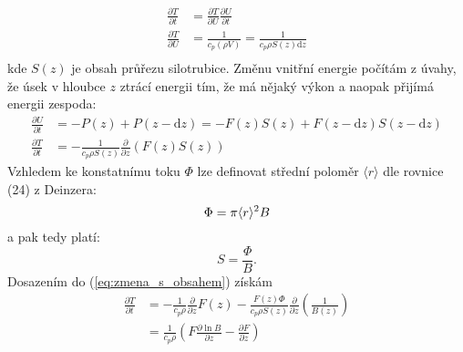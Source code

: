\documentclass[11pt]{article}
\def\D{\mathrm{d}}
\newcommand{\pder}[2][]{\frac{\partial#1}{\partial#2}}
\begin{document}
\begin{align}
	\pder[T]{t} &= \pder[T]{U}\pder[U]{t}\\
	\pder[T]{U} &= \frac{1}{c_p(\rho V)} = \frac{1}{c_p\rho S(z)\D z}\\
\end{align}
kde $S(z)$ je obsah průřezu silotrubice. Změnu vnitřní energie počítám z úvahy, že úsek v hloubce $z$ ztrácí energii tím, že má nějaký výkon a naopak přijímá energii zespoda:
\begin{align}
	\pder[U]{t} &= -P(z)+P(z-\D z) = -F(z)S(z)+F(z-\D z)S(z-\D z)\\
	\pder[T]{t} &= -\frac{1}{c_p\rho S(z)}\pder[]{z}(F(z)S(z)) \label{eq:zmena_s_obsahem}
\end{align}
Vzhledem ke konstatnímu toku $\Phi$ lze definovat střední poloměr $\langle r\rangle$ dle rovnice (24) z Deinzera:
\begin{equation}
	\Phi=\pi\langle r \rangle^2 B \\
\end{equation}
a pak tedy platí:
\begin{equation}
	S = \frac{\Phi}{B}.
\end{equation}
Dosazením do (\ref{eq:zmena_s_obsahem}) získám
\begin{equation}
\begin{aligned}
	\pder[T]{t} &= -\frac{1}{c_p\rho}\pder[]{z}F(z)-\frac{F(z)\Phi}{c_p\rho S(z)}\pder[]{z}\left(\frac{1}{B(z)}\right)\\
				&= \frac{1}{c_p\rho}\left(F\pder[\ln B]{z}-\pder[F]{z}\right)
\end{aligned}
\end{equation}
\end{document}
